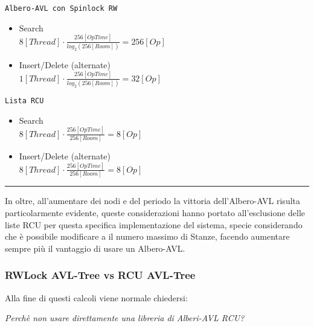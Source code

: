 \begin{minipage}{0.45\linewidth}
\begin{center}
\texttt{Albero-AVL con Spinlock RW}
\end{center}
\begin{itemize}
 \item[\faSmileO] Search \\
 $8 [Thread] \cdot \frac{256 [OpTime]}{log_2(256 [Room])} = 256 [Op]$

 \item[\faSmileO] Insert/Delete (alternate) \\
 $1 [Thread] \cdot \frac{256 [OpTime]}{log_2(256 [Room])} = 32 [Op]$
\end{itemize}
\end{minipage}
\hfill
\begin{minipage}{0.45\linewidth}
\begin{center}
\texttt{Lista RCU}
\end{center}
\begin{itemize}
 \item[\faFrownO] Search\\
  $8 [Thread] \cdot \frac{256 [OpTime]}{256 [Room]} = 8 [Op]$
 \item[\faFrownO] Insert/Delete (alternate) \\
  $8 [Thread] \cdot \frac{256 [OpTime]}{256 [Room]} = 8 [Op]$
\end{itemize}
\end{minipage}

\rule{\linewidth}{0.5pt}

In oltre, all'aumentare dei nodi e del periodo la vittoria dell'Albero-AVL risulta particolarmente evidente, queste
considerazioni hanno portato all'esclusione delle liste RCU per questa specifica implementazione del sistema, specie
considerando che è possibile modificare a \RunTime il numero massimo di Stanze, facendo aumentare sempre più il
vantaggio di usare un Albero-AVL.

\subsubsection{RWLock AVL-Tree vs RCU AVL-Tree} \label{AVL_Vs_RCUAvl}

Alla fine di questi calcoli viene normale chiedersi:

\begin{center}
\textit{Perchè non usare direttamente una libreria di Alberi-AVL RCU?}
\end{center}

